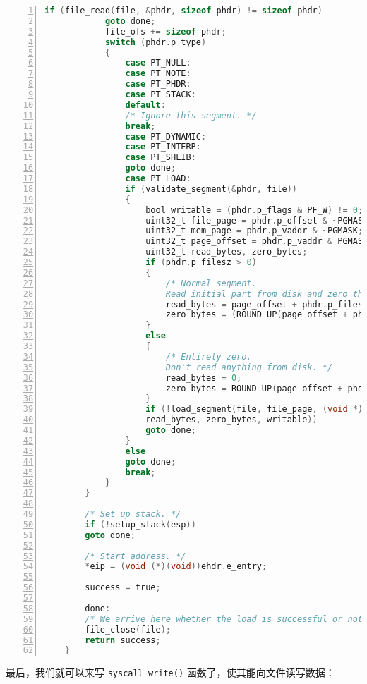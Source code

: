 \documentclass{article}
\begin{document}
\begin{lstlisting}[xleftmargin = 4em,xrightmargin = 4em, aboveskip = 1em, numbers = left, language = C,title=src/userprog/process.c - load()]
            if (file_read(file, &phdr, sizeof phdr) != sizeof phdr)
            goto done;
            file_ofs += sizeof phdr;
            switch (phdr.p_type)
            {
                case PT_NULL:
                case PT_NOTE:
                case PT_PHDR:
                case PT_STACK:
                default:
                /* Ignore this segment. */
                break;
                case PT_DYNAMIC:
                case PT_INTERP:
                case PT_SHLIB:
                goto done;
                case PT_LOAD:
                if (validate_segment(&phdr, file))
                {
                    bool writable = (phdr.p_flags & PF_W) != 0;
                    uint32_t file_page = phdr.p_offset & ~PGMASK;
                    uint32_t mem_page = phdr.p_vaddr & ~PGMASK;
                    uint32_t page_offset = phdr.p_vaddr & PGMASK;
                    uint32_t read_bytes, zero_bytes;
                    if (phdr.p_filesz > 0)
                    {
                        /* Normal segment.
                        Read initial part from disk and zero the rest. */
                        read_bytes = page_offset + phdr.p_filesz;
                        zero_bytes = (ROUND_UP(page_offset + phdr.p_memsz, PGSIZE) - read_bytes);
                    }
                    else
                    {
                        /* Entirely zero.
                        Don't read anything from disk. */
                        read_bytes = 0;
                        zero_bytes = ROUND_UP(page_offset + phdr.p_memsz, PGSIZE);
                    }
                    if (!load_segment(file, file_page, (void *)mem_page,
                    read_bytes, zero_bytes, writable))
                    goto done;
                }
                else
                goto done;
                break;
            }
        }
        
        /* Set up stack. */
        if (!setup_stack(esp))
        goto done;
        
        /* Start address. */
        *eip = (void (*)(void))ehdr.e_entry;
        
        success = true;
        
        done:
        /* We arrive here whether the load is successful or not. */
        file_close(file);
        return success;
    }
	\end{lstlisting}
	
	最后，我们就可以来写 \texttt{syscall\_write()} 函数了，使其能向文件读写数据：
	
\end{document}
